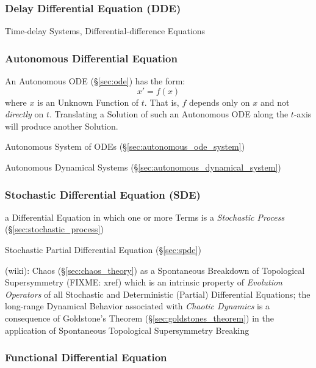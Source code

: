\subsubsection{Delay Differential Equation (DDE)}\label{sec:dde}

Time-delay Systems, Differential-difference Equations



\subsubsection{Autonomous Differential Equation}
\label{sec:autonomous_differential_equation}

An Autonomous ODE (\S\ref{sec:ode}) has the form:
\[
  x' = f(x)
\]
where $x$ is an Unknown Function of $t$. That is, $f$ depends only on $x$ and
not \emph{directly} on $t$. Translating a Solution of such an Autonomous ODE
along the $t$-axis will produce another Solution.

\fist Autonomous System of ODEs (\S\ref{sec:autonomous_ode_system})

\fist Autonomous Dynamical Systems (\S\ref{sec:autonomous_dynamical_system})



\subsubsection{Stochastic Differential Equation (SDE)}\label{sec:sde}

a Differential Equation in which one or more Terms is a \emph{Stochastic
  Process} (\S\ref{sec:stochastic_process})

\fist Stochastic Partial Differential Equation (\S\ref{sec:spde})

(wiki): Chaos (\S\ref{sec:chaos_theory}) as a Spontaneous Breakdown of
Topological Supersymmetry (FIXME: xref) which is an intrinsic property of
\emph{Evolution Operators} of all Stochastic and Deterministic (Partial)
Differential Equations; the long-range Dynamical Behavior associated with
\emph{Chaotic Dynamics} is a consequence of Goldstone's Theorem
(\S\ref{sec:goldstones_theorem}) in the application of Spontaneous Topological
Supersymmetry Breaking



\subsubsection{Functional Differential Equation}\label{sec:fde}


